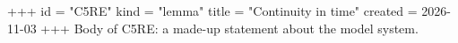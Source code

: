 +++
id = "C5RE"
kind = "lemma"
title = "Continuity in time"
created = 2026-11-03
+++
Body of C5RE: a made-up statement about the model system.

